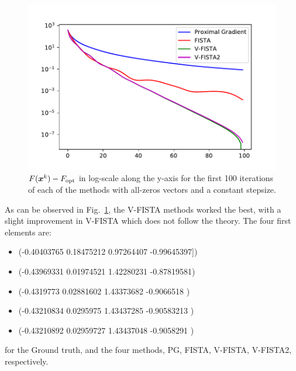 \begin{figure}[H]
    \centering
    \includegraphics[width=14cm]{images/part2_ex0.pdf}
    \caption{$F(\boldsymbol x^k)-F_{\text{opt}}$ in log-scale along the 
  y-axis for the first 100 iterations of each of the methods 
  with all-zeros vectors and a constant stepsize. }
  \label{fig: ex0}
\end{figure}
%
As can be observed in Fig.~\ref{fig: ex0}, the V-FISTA 
methods worked the best, with a slight improvement in 
V-FISTA which does not follow the theory.
The four first elements are:
\begin{itemize}
    \item (-0.40403765  0.18475212  0.97264407 -0.99645397])
    \item (-0.43969331  0.01974521  1.42280231 -0.87819581)
    \item (-0.4319773   0.02881602  1.43373682 -0.9066518 )
    \item (-0.43210834  0.0295975   1.43437285 -0.90583213 )
    \item (-0.43210892  0.02959727  1.43437048 -0.9058291 )
\end{itemize}
%
for the Ground truth, and the four methods, PG, FISTA,
V-FISTA, V-FISTA2, respectively.